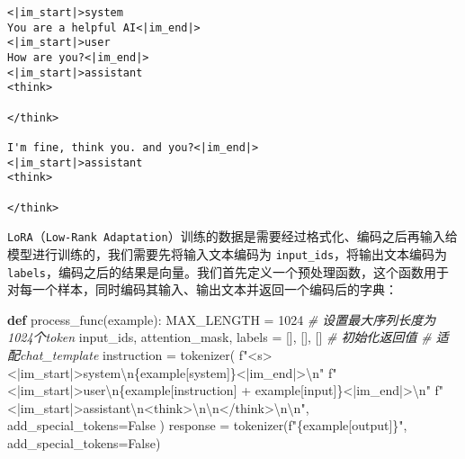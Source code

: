 \documentclass[
]{article}
\newenvironment{Shaded}{}{}
\newcommand{\CharTok}[1]{\textcolor[rgb]{0.25,0.44,0.63}{#1}}
\newcommand{\CommentTok}[1]{\textcolor[rgb]{0.38,0.63,0.69}{\textit{#1}}}
\newcommand{\DecValTok}[1]{\textcolor[rgb]{0.25,0.63,0.44}{#1}}
\newcommand{\KeywordTok}[1]{\textcolor[rgb]{0.00,0.44,0.13}{\textbf{#1}}}
\newcommand{\NormalTok}[1]{#1}
\newcommand{\OperatorTok}[1]{\textcolor[rgb]{0.40,0.40,0.40}{#1}}
\newcommand{\SpecialCharTok}[1]{\textcolor[rgb]{0.25,0.44,0.63}{#1}}
\newcommand{\SpecialStringTok}[1]{\textcolor[rgb]{0.73,0.40,0.53}{#1}}
\newcommand{\StringTok}[1]{\textcolor[rgb]{0.25,0.44,0.63}{#1}}
\newcommand{\VariableTok}[1]{\textcolor[rgb]{0.10,0.09,0.49}{#1}}
\begin{document}
\begin{verbatim}
<|im_start|>system
You are a helpful AI<|im_end|>
<|im_start|>user
How are you?<|im_end|>
<|im_start|>assistant
<think>

</think>

I'm fine, think you. and you?<|im_end|>
<|im_start|>assistant
<think>

</think>
\end{verbatim}

\texttt{LoRA}（\texttt{Low-Rank\ Adaptation}）训练的数据是需要经过格式化、编码之后再输入给模型进行训练的，我们需要先将输入文本编码为
\texttt{input\_ids}，将输出文本编码为
\texttt{labels}，编码之后的结果是向量。我们首先定义一个预处理函数，这个函数用于对每一个样本，同时编码其输入、输出文本并返回一个编码后的字典：

\begin{Shaded}
\begin{Highlighting}[]
\KeywordTok{def}\NormalTok{ process\_func(example):}
\NormalTok{    MAX\_LENGTH }\OperatorTok{=} \DecValTok{1024} \CommentTok{\# 设置最大序列长度为1024个token}
\NormalTok{    input\_ids, attention\_mask, labels }\OperatorTok{=}\NormalTok{ [], [], [] }\CommentTok{\# 初始化返回值}
    \CommentTok{\# 适配chat\_template}
\NormalTok{    instruction }\OperatorTok{=}\NormalTok{ tokenizer(}
        \SpecialStringTok{f"\textless{}s\textgreater{}\textless{}|im\_start|\textgreater{}system}\CharTok{\textbackslash{}n}\SpecialCharTok{\{}\NormalTok{example[}\StringTok{\textquotesingle{}system\textquotesingle{}}\NormalTok{]}\SpecialCharTok{\}}\SpecialStringTok{\textless{}|im\_end|\textgreater{}}\CharTok{\textbackslash{}n}\SpecialStringTok{"}
        \SpecialStringTok{f"\textless{}|im\_start|\textgreater{}user}\CharTok{\textbackslash{}n}\SpecialCharTok{\{}\NormalTok{example[}\StringTok{\textquotesingle{}instruction\textquotesingle{}}\NormalTok{] }\OperatorTok{+}\NormalTok{ example[}\StringTok{\textquotesingle{}input\textquotesingle{}}\NormalTok{]}\SpecialCharTok{\}}\SpecialStringTok{\textless{}|im\_end|\textgreater{}}\CharTok{\textbackslash{}n}\SpecialStringTok{"}
        \SpecialStringTok{f"\textless{}|im\_start|\textgreater{}assistant}\CharTok{\textbackslash{}n}\SpecialStringTok{\textless{}think\textgreater{}}\CharTok{\textbackslash{}n\textbackslash{}n}\SpecialStringTok{\textless{}/think\textgreater{}}\CharTok{\textbackslash{}n\textbackslash{}n}\SpecialStringTok{"}\NormalTok{,}
\NormalTok{        add\_special\_tokens}\OperatorTok{=}\VariableTok{False}
\NormalTok{    )}
\NormalTok{    response }\OperatorTok{=}\NormalTok{ tokenizer(}\SpecialStringTok{f"}\SpecialCharTok{\{}\NormalTok{example[}\StringTok{\textquotesingle{}output\textquotesingle{}}\NormalTok{]}\SpecialCharTok{\}}\SpecialStringTok{"}\NormalTok{, add\_special\_tokens}\OperatorTok{=}\VariableTok{False}\NormalTok{)}

\end{Highlighting}
\end{Shaded}
\end{document}
